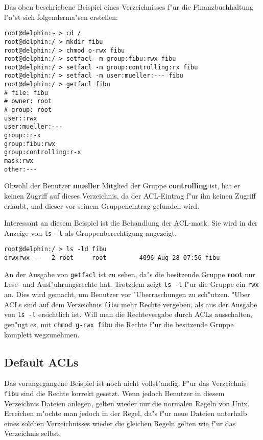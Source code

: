 \documentclass{scrartcl}\usepackage{pslatex}\typearea{12}
\newcommand{\prog}{\texttt}
\newcommand{\dateistyle}{\texttt}
\newcommand{\username}{\textbf}
\begin{document}
Das oben beschriebene Beispiel eines Verzeichnisses f"ur die
Finanzbuchhaltung l"a"st sich folgenderma"sen erstellen:

\begin{verbatim}
root@delphin:~ > cd /
root@delphin:/ > mkdir fibu
root@delphin:/ > chmod o-rwx fibu
root@delphin:/ > setfacl -m group:fibu:rwx fibu
root@delphin:/ > setfacl -m group:controlling:rx fibu
root@delphin:/ > setfacl -m user:mueller:--- fibu
root@delphin:/ > getfacl fibu
# file: fibu
# owner: root
# group: root
user::rwx
user:mueller:---
group::r-x
group:fibu:rwx
group:controlling:r-x
mask:rwx
other:---
\end{verbatim}

Obwohl der Benutzer \username{mueller} Mitglied der Gruppe
\username{controlling} ist, hat er keinen Zugriff auf dieses
Verzeichnis, da der ACL-Eintrag f"ur ihn keinen Zugriff erlaubt, und
dieser vor seinem Gruppeneintrag gefunden wird.

Interessant an diesem Beispiel ist die Behandlung der ACL-mask. Sie
wird in der Anzeige von \prog{ls -l} als Gruppenberechtigung
angezeigt. 

\begin{verbatim}
root@delphin:/ > ls -ld fibu
drwxrwx---   2 root     root         4096 Aug 28 07:56 fibu
\end{verbatim}

An der Ausgabe von \prog{getfacl} ist zu sehen, da"s die besitzende
Gruppe \username{root} nur Lese- und Ausf"uhrungsrechte hat. Trotzdem
zeigt \prog{ls -l} f"ur die Gruppe ein \prog{rwx} an. Dies wird
gemacht, um Benutzer vor "Uberraschungen zu sch"utzen. "Uber ACLs sind
auf dem Verzeichnis \dateistyle{fibu} mehr Rechte vergeben, als aus
der Ausgabe von \prog{ls -l} ersichtlich ist. Will man die
Rechtevergabe durch ACLs ausschalten, gen"ugt es, mit \prog{chmod
  g-rwx fibu} die Rechte f"ur die besitzende Gruppe komplett
wegzunehmen.

\subsection{Default ACLs}

Das vorangegangene Beispiel ist noch nicht vollst"andig. F"ur das
Verzeichnis \dateistyle{fibu} sind die Rechte korrekt gesetzt. Wenn
jedoch Benutzer in diesem Verzeichnis Dateien anlegen, gelten wieder
nur die normalen Regeln von Unix. Erreichen m"ochte man jedoch in der
Regel, da"s f"ur neue Dateien unterhalb eines solchen Verzeichnisses
wieder die gleichen Regeln gelten wie f"ur das Verzeichnis selbst.
\end{document}
